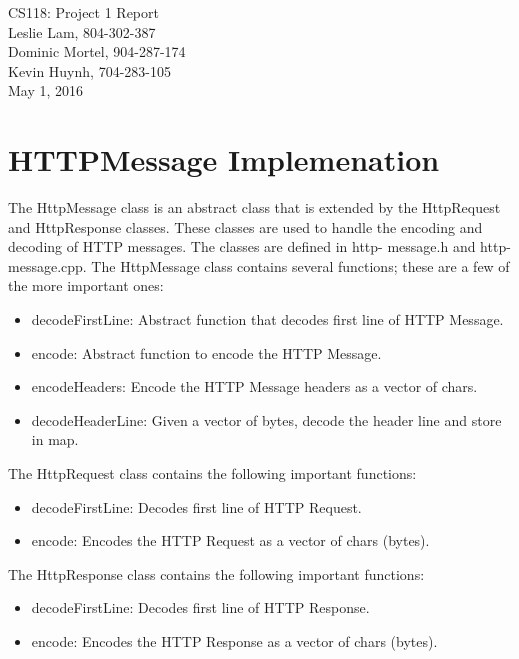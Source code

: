 \documentclass{article}
\begin{document}
\newcommand{\coverpage}{
  \onecolumn
  \begin{center}
    \LARGE\labtitle \\ \bigskip \bigskip \large\name
    \\ \bigskip \labdate
    \end{center}
  \setcounter{page}{1} }

\newcommand{\labtitle}{CS118: Project 1 Report}
\newcommand{\name}{Leslie Lam, 804-302-387 \\ Dominic Mortel, 904-287-174 \\
Kevin Huynh, 704-283-105}
\newcommand{\labdate}{May 1, 2016}

\coverpage

\section{HTTPMessage Implemenation}
    The HttpMessage class is an abstract class that is extended by the
    HttpRequest and HttpResponse classes. These classes are used to handle the
    encoding and decoding of HTTP messages. The classes are defined in http-
    message.h and http-message.cpp. The HttpMessage class contains several
    functions; these are a few of the more important ones:
    \begin{itemize}
        \item decodeFirstLine: Abstract function that decodes first line of
            HTTP Message.
        \item encode: Abstract function to encode the HTTP Message.
        \item encodeHeaders: Encode the HTTP Message headers as a vector of
            chars.
        \item decodeHeaderLine: Given a vector of bytes, decode the header line
            and store in map.
    \end{itemize}
    The HttpRequest class contains the following important functions:
    \begin{itemize}
        \item decodeFirstLine: Decodes first line of HTTP Request.
        \item encode: Encodes the HTTP Request as a vector of chars (bytes).
    \end{itemize}
    The HttpResponse class contains the following important functions:
    \begin{itemize}
        \item decodeFirstLine: Decodes first line of HTTP Response.
        \item encode: Encodes the HTTP Response as a vector of chars (bytes).
    \end{itemize}
    
\end{document}
